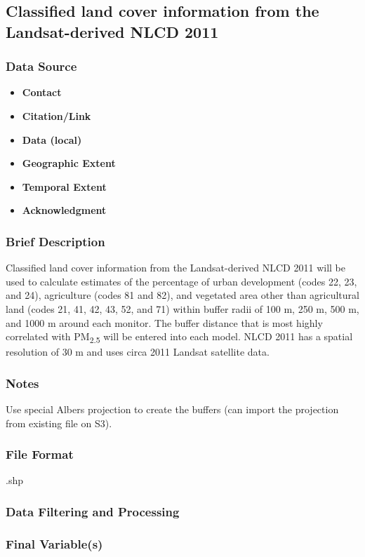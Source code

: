 \subsection{Classified land cover information from the Landsat-derived NLCD 2011}
\subsubsection*{Data Source}
\begin{itemize}[nolistsep]
\item \textbf{Contact}
\item \textbf{Citation/Link}
\item \textbf{Data (local)}
\item \textbf{Geographic Extent}
\item \textbf{Temporal Extent}
\item \textbf{Acknowledgment}
\end{itemize}
\subsubsection*{Brief Description}

Classified land cover information from the Landsat-derived NLCD 2011 
\citep{Homer2017} will be used to calculate estimates of the percentage of urban development (codes 22, 23, and 24), agriculture (codes 81 and 82), and vegetated area other than agricultural land (codes 21, 41, 42, 43, 52, and 71) within buffer radii of 100 m, 250 m, 500 m, and 1000 m around each monitor. The buffer distance that is most highly correlated with PM\textsubscript{2.5} will be entered into each model. NLCD 2011 has a spatial resolution of 30 m and uses circa 2011 Landsat satellite data. 

\subsubsection*{Notes}
Use special Albers projection to create the buffers (can import the projection from existing file on S3).
\subsubsection*{File Format} .shp
\subsubsection*{Data Filtering and Processing}
\subsubsection*{Final Variable(s)}
